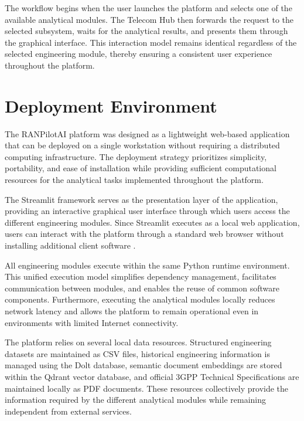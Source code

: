 The workflow begins when the user launches the platform and selects one of the available analytical modules. The Telecom Hub then forwards the request to the selected subsystem, waits for the analytical results, and presents them through the graphical interface. This interaction model remains identical regardless of the selected engineering module, thereby ensuring a consistent user experience throughout the platform.


\section{Deployment Environment}

The RANPilotAI platform was designed as a lightweight web-based application that can be deployed on a single workstation without requiring a distributed computing infrastructure. The deployment strategy prioritizes simplicity, portability, and ease of installation while providing sufficient computational resources for the analytical tasks implemented throughout the platform.

The Streamlit framework serves as the presentation layer of the application, providing an interactive graphical user interface through which users access the different engineering modules. Since Streamlit executes as a local web application, users can interact with the platform through a standard web browser without installing additional client software \cite{pressman2014}.

All engineering modules execute within the same Python runtime environment. This unified execution model simplifies dependency management, facilitates communication between modules, and enables the reuse of common software components. Furthermore, executing the analytical modules locally reduces network latency and allows the platform to remain operational even in environments with limited Internet connectivity.

The platform relies on several local data resources. Structured engineering datasets are maintained as CSV files, historical engineering information is managed using the Dolt database, semantic document embeddings are stored within the Qdrant vector database, and official 3GPP Technical Specifications are maintained locally as PDF documents. These resources collectively provide the information required by the different analytical modules while remaining independent from external services.

